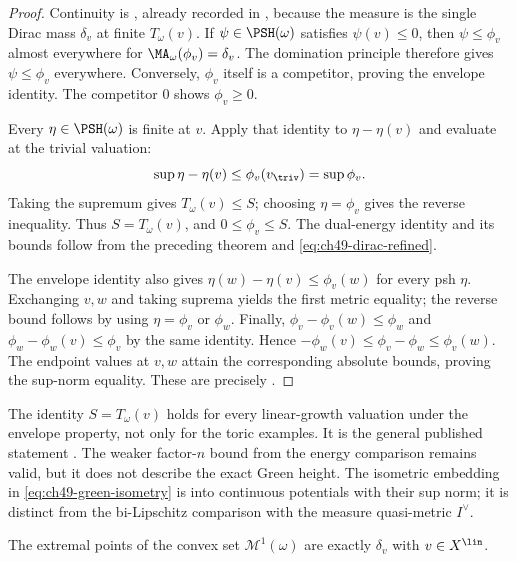 \begin{proof}
Continuity is \cite[Theorem~12.12]{BJ22}, already recorded in
, because the measure is the single Dirac
mass $\delta_v$ at finite $T_\omega(v)$.
If $\psi\in\PSH(\omega)$ satisfies $\psi(v)\le0$, then
$\psi\le\phi_v$ almost everywhere for $\MA_\omega(\phi_v)=\delta_v$.
The domination principle  therefore gives
$\psi\le\phi_v$ everywhere.  Conversely, $\phi_v$ itself is a
competitor, proving the envelope identity.
The competitor $0$ shows $\phi_v\ge0$.

Every $\eta\in\PSH(\omega)$ is finite at $v$.  Apply that identity
to $\eta-\eta(v)$ and evaluate at the trivial valuation:
\[
 \sup\eta-\eta(v)\le\phi_v(v_{\triv})=\sup\phi_v.
\]
Taking the supremum gives $T_\omega(v)\le S$; choosing $\eta=\phi_v$
gives the reverse inequality.  Thus $S=T_\omega(v)$, and
$0\le\phi_v\le S$.  The dual-energy identity and its bounds follow
from the preceding theorem and \eqref{eq:ch49-dirac-refined}.

The envelope identity also gives
$\eta(w)-\eta(v)\le\phi_v(w)$ for every psh $\eta$.
Exchanging $v,w$ and taking suprema yields the first metric equality;
the reverse bound follows by using $\eta=\phi_v$ or $\phi_w$.
Finally,
$\phi_v-\phi_v(w)\le\phi_w$ and
$\phi_w-\phi_w(v)\le\phi_v$ by the same identity.
Hence $-\phi_w(v)\le\phi_v-\phi_w\le\phi_v(w)$.
The endpoint values at $v,w$ attain the corresponding absolute
bounds, proving the sup-norm equality.
These are precisely \cite[Proposition~12.14(i)--(iv)]{BJ22}.
\end{proof}

\begin{remark}
\label{rem:ch49-S-vs-T}
The identity $S=T_\omega(v)$ holds for every linear-growth valuation
under the envelope property, not only for the toric examples.
It is the general published statement
\cite[Proposition~12.14(iv)]{BJ22}.
The weaker factor-$n$ bound from the energy comparison remains valid,
but it does not describe the exact Green height.
The isometric embedding in \eqref{eq:ch49-green-isometry} is into
continuous potentials with their sup norm; it is distinct from the
bi-Lipschitz comparison with the measure quasi-metric $I^\vee$.
\end{remark}

\begin{corollary}\label{cor:bj-extremal-measures-dirac}
The extremal points of the convex set $\mathcal M^1(\omega)$ are exactly
$\delta_v$ with $v\in X^{\lin}$.
\end{corollary}

